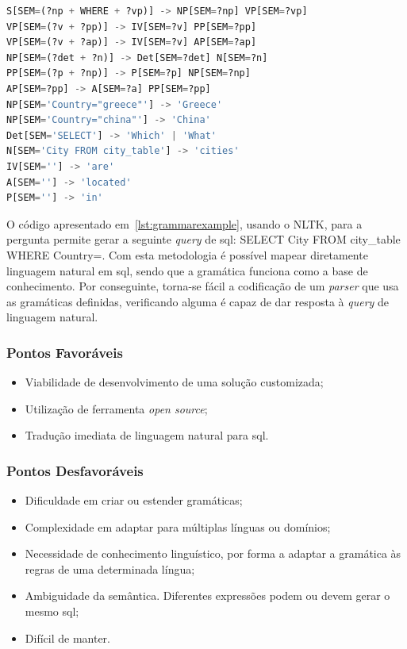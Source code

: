 \begin{lstlisting}[language=Python,caption={Excerto de uma gramática extraída de~\textcite{natural_language_processing_with_python}},numbers=none,label=lst:grammarexample,basicstyle=\scriptsize]
S[SEM=(?np + WHERE + ?vp)] -> NP[SEM=?np] VP[SEM=?vp]
VP[SEM=(?v + ?pp)] -> IV[SEM=?v] PP[SEM=?pp]
VP[SEM=(?v + ?ap)] -> IV[SEM=?v] AP[SEM=?ap]
NP[SEM=(?det + ?n)] -> Det[SEM=?det] N[SEM=?n]
PP[SEM=(?p + ?np)] -> P[SEM=?p] NP[SEM=?np]
AP[SEM=?pp] -> A[SEM=?a] PP[SEM=?pp]
NP[SEM='Country="greece"'] -> 'Greece'
NP[SEM='Country="china"'] -> 'China'
Det[SEM='SELECT'] -> 'Which' | 'What'
N[SEM='City FROM city_table'] -> 'cities'
IV[SEM=''] -> 'are'
A[SEM=''] -> 'located'
P[SEM=''] -> 'in'
\end{lstlisting}

O código apresentado em~\ref{lst:grammarexample}, usando o NLTK, para a pergunta  permite gerar a seguinte \textit{query} de \gls{sql}: SELECT City FROM city\_table WHERE Country=. Com esta metodologia é possível mapear diretamente linguagem natural em \gls{sql}, sendo que a gramática funciona como a base de conhecimento. Por conseguinte, torna-se fácil a codificação de um \textit{parser} que usa as gramáticas definidas, verificando
alguma é capaz de dar resposta à \textit{query} de linguagem natural.

\subsubsection*{Pontos Favoráveis}
\begin{itemize}
    \item 
    {
        Viabilidade de desenvolvimento de uma solução customizada;
    }
    \item
    {
        Utilização de ferramenta \textit{open source};
    }
    \item 
    {
        Tradução imediata de linguagem natural para \gls{sql}. 
    }
\end{itemize}

\subsubsection*{Pontos Desfavoráveis}
\begin{itemize}
    \item 
    {
        Dificuldade em criar ou estender gramáticas;
    }
    \item
    {
        Complexidade em adaptar para múltiplas línguas ou domínios;
    }
    \item
    {
        Necessidade de conhecimento linguístico, por forma a adaptar a gramática às regras de uma determinada língua;
    }
    \item
    {
        Ambiguidade da semântica. Diferentes expressões podem ou devem gerar o mesmo \gls{sql};
    }
    \item
    {
        Difícil de manter.
    }
\end{itemize}

